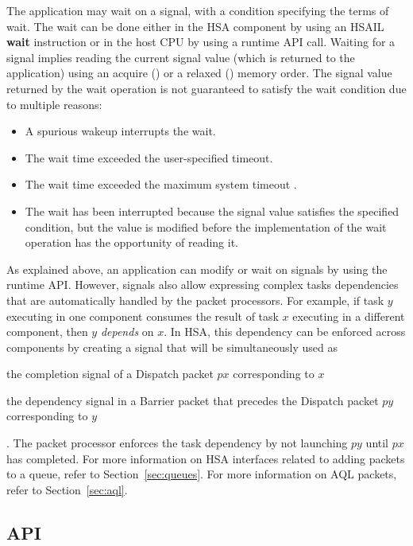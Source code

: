 \documentclass[final]{book}
\newcommand{\reffun}[1]{\textbf{#1}}
\newcommand{\refhsl}[1]{\reffun{#1}}
\begin{document}
The application may wait on a signal, with a condition specifying the terms of
wait. The wait can be done either in the HSA component by using an HSAIL
\refhsl{wait} instruction or in the host CPU by using a runtime API
call. Waiting for a signal implies reading the current signal value (which is
returned to the application) using an acquire ()
or a relaxed () memory order. The signal value
returned by the wait operation is not guaranteed to satisfy the wait condition
due to multiple reasons:
\begin{itemize}[itemsep=1pt,topsep=3pt,partopsep=0pt]
\item A spurious wakeup interrupts the wait.
\item The wait time exceeded the user-specified timeout.
\item The wait time exceeded the maximum system timeout
  .
\item The wait has been interrupted because the signal value satisfies the
  specified condition, but the value is modified before the implementation of
  the wait operation has the opportunity of reading it.
\end{itemize}

As explained above, an application can modify or wait on signals by using the
runtime API. However, signals also allow expressing complex tasks dependencies
that are automatically handled by the packet processors. For example, if task
$y$ executing in one component consumes the result of task $x$ executing in a
different component, then $y$ \textit{depends} on $x$. In HSA, this dependency
can be enforced across components by creating a signal that will be
simultaneously used as \begin{inparaenum}[a\upshape)] \item the completion
  signal of a Dispatch packet $px$ corresponding to $x$ \item the dependency
  signal in a Barrier packet that precedes the Dispatch packet $py$
  corresponding to $y$\end{inparaenum}. The packet processor enforces the task
dependency by not launching $py$ until $px$ has completed. For more information
on HSA interfaces related to adding packets to a queue, refer to
Section~\ref{sec:queues}. For more information on AQL packets, refer to
Section~\ref{sec:aql}.

\subsection{API}
\end{document}
